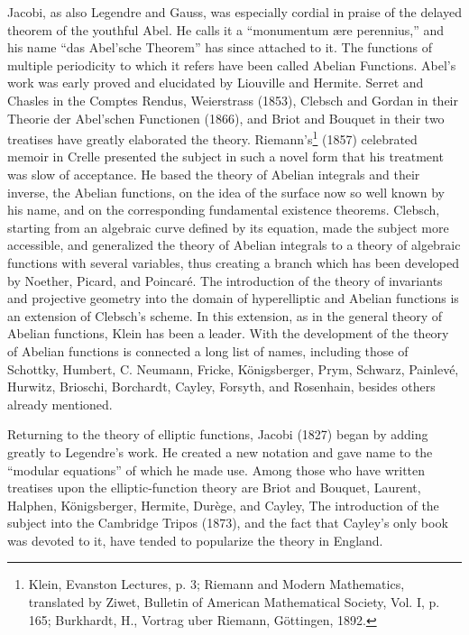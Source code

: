 \documentclass[oneside]{book}
\begin{document}
{Jacobi, as also Legendre and Gauss, was especially cordial in praise
of the delayed theorem of the youthful Abel. He calls it a
``monumentum \ae{}re perennius,'' and his name ``das Abel'sche
Theorem'' has since attached to it. The functions of multiple
periodicity to which it refers have been called Abelian
Functions. Abel's work was early proved and elucidated by Liouville
and Hermite. Serret and Chasles in the Comptes Rendus, Weierstrass
(1853), Clebsch and Gordan in their Theorie der Abel'schen
Functionen (1866), and Briot and Bouquet in their two treatises have
greatly elaborated the theory. Riemann's\footnote{Klein, Evanston
Lectures, p. 3; Riemann and Modern Mathematics, translated by
Ziwet, Bulletin of American Mathematical Society, Vol. I, p. 165;
Burkhardt, H., Vortrag uber Riemann, G\"ottingen, 1892.} (1857)
celebrated memoir in Crelle presented the subject in such a novel
form that his treatment was slow of acceptance. He based the theory
of Abelian integrals and their inverse, the Abelian functions, on
the idea of the surface now so well known by his name, and on the
corresponding fundamental existence theorems. Clebsch, starting from
an algebraic curve defined by its equation, made the subject more
accessible, and generalized the theory of Abelian integrals to a
theory of algebraic functions with several variables, thus creating
a branch which has been developed by Noether, Picard, and
Poincar\'e. The introduction of the theory of invariants and
projective geometry into the domain of hyperelliptic and Abelian
functions is an extension of Clebsch's scheme. In this extension, as
in the general theory of Abelian functions, Klein has been a
leader. With the development of the theory of Abelian functions is
connected a long list of names, including those of Schottky,
Humbert, C. Neumann, Fricke, K\"onigsberger, Prym, Schwarz,
Painlev\'e, Hurwitz, Brioschi, Borchardt, Cayley, Forsyth, and
Rosenhain, besides others already mentioned.

Returning to the theory of elliptic functions, Jacobi (1827) began
by adding greatly to Legendre's work. He created a new notation and
gave name to the ``modular equations'' of which he made use. Among
those who have written treatises upon the elliptic-function theory
are Briot and Bouquet, Laurent, Halphen, K\"onigsberger, Hermite,
Dur\`ege, and Cayley, The introduction of the subject into the
Cambridge Tripos (1873), and the fact that Cayley's only book was
devoted to it, have tended to popularize the theory in England.

}
\end{document}
